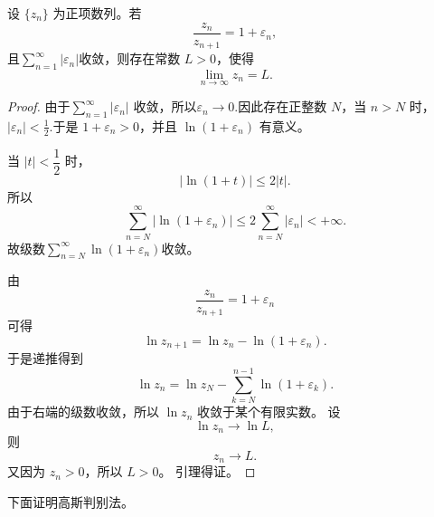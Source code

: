 \begin{lemma}
设 $\{z_n\}$ 为正项数列。若
\[
\frac{z_n}{z_{n+1}}=1+\varepsilon_n,
\]
且$\sum\limits_{n=1}^{\infty}|\varepsilon_n|$收敛，则存在常数 $L>0$，使得
\[
\lim_{n\to\infty} z_n=L.
\]
\end{lemma}
\begin{proof}
	由于$\sum\limits_{n=1}^{\infty}|\varepsilon_n|$
收敛，所以$\varepsilon_n\to 0.$因此存在正整数 $N$，当 $n>N$ 时，$|\varepsilon_n|<\frac12.$于是 $1+\varepsilon_n>0$，并且 $\ln(1+\varepsilon_n)$ 有意义。

当 $|t|<\dfrac12$ 时，
\[
|\ln(1+t)|\leq 2|t|.
\]
所以
\[
\sum_{n=N}^{\infty}|\ln(1+\varepsilon_n)|
\leq
2\sum_{n=N}^{\infty}|\varepsilon_n|
<+\infty.
\]
故级数$\sum_{n=N}^{\infty}\ln(1+\varepsilon_n)$收敛。

由
\[
\frac{z_n}{z_{n+1}}=1+\varepsilon_n
\]
可得
\[
\ln z_{n+1}
=
\ln z_n-\ln(1+\varepsilon_n).
\]
于是递推得到
\[
\ln z_n
=
\ln z_N-\sum_{k=N}^{n-1}\ln(1+\varepsilon_k).
\]
由于右端的级数收敛，所以 $\ln z_n$ 收敛于某个有限实数。
设
\[
\ln z_n\to \ln L,
\]
则
\[
z_n\to L.
\]
又因为 $z_n>0$，所以 $L>0$。
引理得证。
\end{proof}



下面证明高斯判别法。

